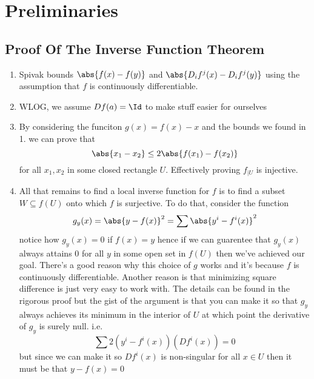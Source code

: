 \documentclass{pset}
\begin{document}
\maketitle

\pagebreak 
\section{Preliminaries}
\subsection{Proof Of The Inverse Function Theorem}
\begin{enumerate}
    \item Spivak bounds $\abs{f(x)-f(y)}$ and $\abs{D_if^j(x)-D_if^j(y)}$ using the assumption that $f$ is continuously differentiable.
    \item WLOG, we assume $Df(a) = \Id$ to make stuff easier for ourselves
    \item By considering the funciton $g(x) = f(x)-x$ and the bounds we found in 1. we can prove that 
    \[\abs{x_1-x_2}\leq 2\abs{f(x_1)-f(x_2)}\]
    for all $x_1,x_2$ in some closed rectangle $U$. Effectively proving $f_{\mid U}$ is injective.
    \item All that remains to find a local inverse function for $f$ is to find a subset $W\subseteq f(U)$ onto which $f$ is surjective. To do that, consider the function 
    \[g_y(x) = \abs{y-f(x)}^2 = \sum \abs{y^i-f^i(x)}^2\]
    notice how $g_y(x)=0$ if $f(x)=y$ hence if we can guarentee that $g_y(x)$ always attains 0 for all $y$ in some open set in $f(U)$ then we've achieved our goal. There's a good reason why this choice of $g$ works and it's because $f$ is continuously differentiable. Another reason is that minimizing square difference is just very easy to work with. The details can be found in the rigorous proof but the gist of the argument is that you can make it so that $g_y$ always achieves its minimum in the interior of $U$ at which point the derivative of $g_y$ is surely null. i.e.
    \[\sum 2(y^i-f^i(x))(Df^i(x)) = 0\]
    but since we can make it so $Df^i(x)$ is non-singular for all $x\in U$ then it must be that $y-f(x)=0$
\end{enumerate}
\end{document}

